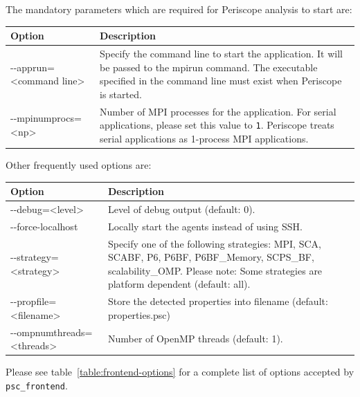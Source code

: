 \documentclass[11pt,oneside,a4paper]{book}
\begin{document}
The mandatory parameters which are required for Periscope analysis to start are:

\begin{center}
 \begin{longtable}{|l|p{6.5cm}|} %
  \hline %
  Option & Description \\
  \hline
  -{}-apprun=\textless command line\textgreater &
  Specify the command line to start the application. It will be passed to the mpirun command. \newline
  The executable specified in the command line must exist when Periscope is started. \\
  \hline
  -{}-mpinumprocs=\textless np\textgreater & Number of MPI processes for the
  application.\newline\newline
  For serial applications, please set this value to \texttt{1}. Periscope treats serial
  applications as 1-process MPI applications. \\
  \hline
 \end{longtable}
\end{center}

Other frequently used options are:
\begin{center}
 \begin{longtable}{|l|p{6.5cm}|} %
  \hline %
  Option & Description \\
  \hline
  -{}-debug=\textless level\textgreater & Level of debug output (default: 0). \\
  \hline
  -{}-force-localhost & Locally start the agents instead of using SSH. \\
  \hline
  -{}-strategy=\textless strategy\textgreater & Specify one of the following
  strategies: MPI, SCA, SCABF, P6, P6BF, P6BF\_Memory, SCPS\_BF,
  scalability\_OMP. Please note: Some strategies are platform dependent (default: all). \\
   \hline
  -{}-propfile=\textless filename\textgreater & Store the detected properties
  into filename (default: properties.psc) \\
  \hline
  -{}-ompnumthreads=\textless threads\textgreater & Number of OpenMP threads (default: 1).\\
  \hline
 \end{longtable}
\end{center}

Please see table~\ref{table:frontend-options} for a complete list of options accepted by \texttt{psc\_frontend}.
\end{document}
